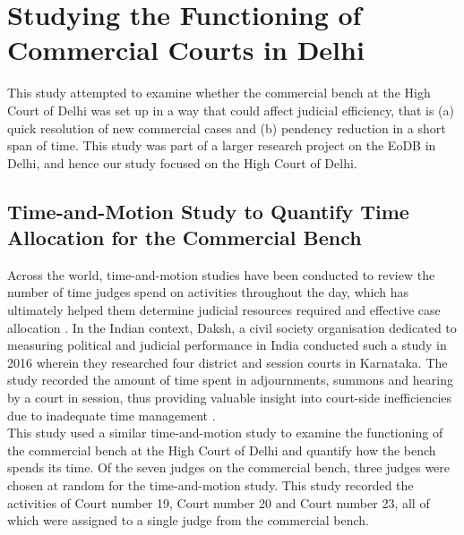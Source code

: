 \documentclass[a4paper, 12pt, twoside]{article}
\begin{document}
\section{Studying the Functioning of Commercial Courts in Delhi}\label{sec:2}

This study attempted to examine whether the commercial bench at the High Court of Delhi was set up in a way that could affect judicial efficiency, that is (a) quick resolution of new commercial cases and (b) pendency reduction in a short span of time. This study was part of a larger research project on the EoDB in Delhi, and hence our study focused on the High Court of Delhi. 

\subsection{Time-and-Motion Study to Quantify Time Allocation for the Commercial Bench}

Across the world, time-and-motion studies have been conducted to review the number of time judges spend on activities throughout the day, which has ultimately helped them determine judicial resources required and effective case allocation \parencite{tallaricoreport, balmerreport, lombardreport}. 
In the Indian context, Daksh, a civil society organisation dedicated to measuring political and judicial performance in India conducted such a study in 2016 wherein they researched four district and session courts in Karnataka. The study recorded the amount of time spent in adjournments, summons and hearing by a court in session, thus providing valuable insight into court-side inefficiencies due to inadequate time management \parencite{dakshpaper}. \\

This study used a similar time-and-motion study to examine the functioning of the commercial bench at the High Court of Delhi and quantify how the bench spends its time. Of the seven judges on the commercial bench, three judges were chosen at random for the time-and-motion study. This study recorded the activities of Court number 19, Court number 20 and Court number 23, all of which were assigned to a single judge from the commercial bench. \\
\end{document}
